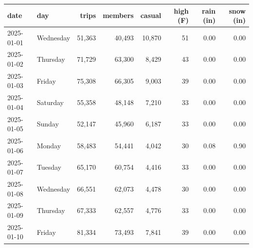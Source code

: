 \begin{tabular}{llrrrrrr}
\toprule
\textbf{date} & \textbf{day} & \textbf{trips} & \textbf{members} & \textbf{casual} & \textbf{high (F)} & \textbf{rain (in)} & \textbf{snow (in)} \\
\midrule
2025-01-01 & Wednesday & 51,363 & 40,493 & 10,870 & 51 & 0.00 & 0.00 \\
2025-01-02 & Thursday & 71,729 & 63,300 & 8,429 & 43 & 0.00 & 0.00 \\
2025-01-03 & Friday & 75,308 & 66,305 & 9,003 & 39 & 0.00 & 0.00 \\
2025-01-04 & Saturday & 55,358 & 48,148 & 7,210 & 33 & 0.00 & 0.00 \\
2025-01-05 & Sunday & 52,147 & 45,960 & 6,187 & 33 & 0.00 & 0.00 \\
2025-01-06 & Monday & 58,483 & 54,441 & 4,042 & 30 & 0.08 & 0.90 \\
2025-01-07 & Tuesday & 65,170 & 60,754 & 4,416 & 33 & 0.00 & 0.00 \\
2025-01-08 & Wednesday & 66,551 & 62,073 & 4,478 & 30 & 0.00 & 0.00 \\
2025-01-09 & Thursday & 67,333 & 62,557 & 4,776 & 33 & 0.00 & 0.00 \\
2025-01-10 & Friday & 81,334 & 73,493 & 7,841 & 39 & 0.00 & 0.00 \\
\bottomrule
\end{tabular}
